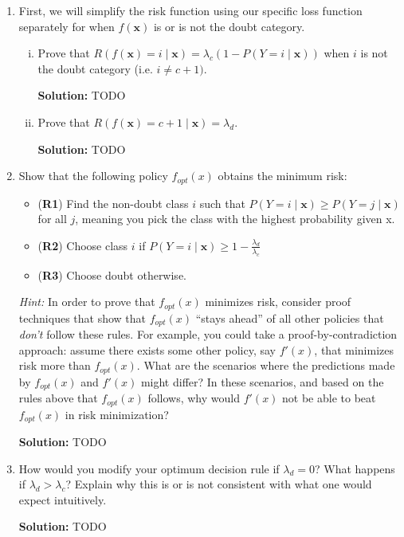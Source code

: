 \documentclass{article}
\renewcommand{\vec}[1]{\boldsymbol{\mathbf{#1}}}
\newenvironment{solution}{\color{blue} \smallskip \textbf{Solution:}}{}
\begin{document}
\begin{enumerate}

\item First, we will simplify the risk function using our specific loss function separately for when $f(\vec{x})$ is or is not the doubt category.
\begin{enumerate}[i.]

\item Prove that $R(f(\vec{x}) = i \mid \vec{x}) = \lambda_c \left(1 - P(Y = i \mid \vec{x}) \right)$ when $i$ is not the doubt category (i.e. $i \neq c + 1)$. 

\begin{solution}
    TODO
\end{solution}

\item Prove that $R(f(\vec{x}) = c+1 \mid \vec{x}) = \lambda_{d}$.

\begin{solution}
    TODO
\end{solution}
\end{enumerate}

\newpage
\item Show that the following policy $f_{opt}(x)$ obtains the minimum risk:
\begin{itemize}
    \item (\textbf{R1}) Find the non-doubt class $i$ such that $P(Y=i \mid \vec{x}) \geq P(Y=j \mid \vec{x})$ for all $j$, meaning you pick the class with the highest probability given x.
    \item (\textbf{R2}) Choose class $i$ if $P(Y=i \mid \vec{x}) \geq 1 - \frac{\lambda_d}{\lambda_c}$
    \item (\textbf{R3}) Choose doubt otherwise.
\end{itemize}
	
\textit{Hint:} In order to prove that $f_{opt}(x)$ minimizes risk, consider proof techniques that show that $f_{opt}(x)$ ``stays ahead'' of all other policies that \textit{don't} follow these rules. For example, you could take a proof-by-contradiction approach: assume there exists some other policy, say $f'(x)$, that minimizes risk more than $f_{opt}(x)$. What are the scenarios where the predictions made by $f_{opt}(x)$ and $f'(x)$ might differ? In these scenarios, and based on the rules above that $f_{opt}(x)$ follows, why would $f'(x)$ not be able to beat $f_{opt}(x)$ in risk minimization?

\begin{solution}
    TODO
\end{solution}

\newpage
\item How would you modify your optimum decision rule if $\lambda_d=0$?  What happens if $\lambda_d>\lambda_c$? Explain why this is or is not consistent with what one would expect intuitively.

\begin{solution}
    TODO
\end{solution}
\end{enumerate}
\end{document}
